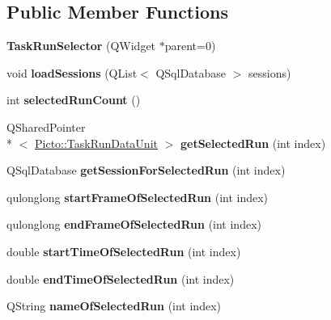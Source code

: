 \subsection*{Public Member Functions}
\begin{DoxyCompactItemize}
\item 
\hypertarget{class_task_run_selector_afc98591775db981e4211e962ca5ea4e4}{{\bfseries Task\-Run\-Selector} (Q\-Widget $\ast$parent=0)}\label{class_task_run_selector_afc98591775db981e4211e962ca5ea4e4}

\item 
\hypertarget{class_task_run_selector_a53ac0bac5196441a79396e0ca30e89d4}{void {\bfseries load\-Sessions} (Q\-List$<$ Q\-Sql\-Database $>$ sessions)}\label{class_task_run_selector_a53ac0bac5196441a79396e0ca30e89d4}

\item 
\hypertarget{class_task_run_selector_a4a74a2f290f394fd069a36f5f9951e8c}{int {\bfseries selected\-Run\-Count} ()}\label{class_task_run_selector_a4a74a2f290f394fd069a36f5f9951e8c}

\item 
\hypertarget{class_task_run_selector_a6deb43cb4ef25d455c6849f4061dd235}{Q\-Shared\-Pointer\\*
$<$ \hyperlink{class_picto_1_1_task_run_data_unit}{Picto\-::\-Task\-Run\-Data\-Unit} $>$ {\bfseries get\-Selected\-Run} (int index)}\label{class_task_run_selector_a6deb43cb4ef25d455c6849f4061dd235}

\item 
\hypertarget{class_task_run_selector_a89f046b6f4486e9f9a4da277497d242b}{Q\-Sql\-Database {\bfseries get\-Session\-For\-Selected\-Run} (int index)}\label{class_task_run_selector_a89f046b6f4486e9f9a4da277497d242b}

\item 
\hypertarget{class_task_run_selector_a468717803f3945c49edf47be6e496212}{qulonglong {\bfseries start\-Frame\-Of\-Selected\-Run} (int index)}\label{class_task_run_selector_a468717803f3945c49edf47be6e496212}

\item 
\hypertarget{class_task_run_selector_adf0b1f25bd9fec8d2f37ec169eae0444}{qulonglong {\bfseries end\-Frame\-Of\-Selected\-Run} (int index)}\label{class_task_run_selector_adf0b1f25bd9fec8d2f37ec169eae0444}

\item 
\hypertarget{class_task_run_selector_a65781223a233b3238e2528736a0871c3}{double {\bfseries start\-Time\-Of\-Selected\-Run} (int index)}\label{class_task_run_selector_a65781223a233b3238e2528736a0871c3}

\item 
\hypertarget{class_task_run_selector_aa11f9f81d27b4a86af36a090a78c1bb1}{double {\bfseries end\-Time\-Of\-Selected\-Run} (int index)}\label{class_task_run_selector_aa11f9f81d27b4a86af36a090a78c1bb1}

\item 
\hypertarget{class_task_run_selector_ae9b4b2e3573f676e4210a17d2a1dc543}{Q\-String {\bfseries name\-Of\-Selected\-Run} (int index)}\label{class_task_run_selector_ae9b4b2e3573f676e4210a17d2a1dc543}

\end{DoxyCompactItemize}


